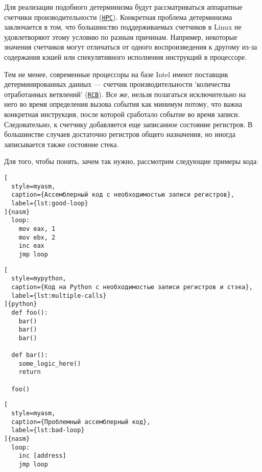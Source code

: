 Для реализации подобного детерминизма будут рассматриваться аппаратные счетчики производительности 
(\href{https://en.wikipedia.org/wiki/Hardware_performance_counter}{\texttt{HPC}}).
Конкретная проблема детерминизма заключается в том, что большинство поддерживаемых счетчиков в Linux 
не удовлетворяют этому условию по разным причинам. 
Например, некоторые значения счетчиков могут отличаться от одного воспроизведения к другому 
из-за содержания кэшей или спекулятивного исполнения инструкций в процессоре.

Тем не менее, современные процессоры на базе Intel имеют поставщик детерминированных данных — счетчик производительности 
'количества отработанных ветвлений'
(\href{https://en.wikipedia.org/wiki/Branch_predictor}{\texttt{RCB}}). 
Все же, нельзя полагаться исключительно на него во время определения вызова события как 
минимум потому, что важна конкретная инструкция, после которой сработало событие во время записи. 
Следовательно, к счетчику добавляется еще 
записанное состояние регистров. 
В большинстве случаев достаточно регистров общего назначения, но иногда записывается также состояние стека. 

Для того, чтобы понять, зачем так нужно, рассмотрим следующие примеры кода:

\newpage
\begin{lstlisting}[
  style=myasm,
  caption={Ассемблерный код с необходимостью записи регистров},
  label={lst:good-loop}
]{nasm}
  loop:
    mov eax, 1
    mov ebx, 2
    inc eax
    jmp loop
\end{lstlisting}

\begin{lstlisting}[
  style=mypython,
  caption={Код на Python с необходимостью записи регистров и стэка},
  label={lst:multiple-calls}
]{python}
  def foo():
    bar()
    bar()
    bar()
  
  def bar():
    some_logic_here()
    return

  foo()
\end{lstlisting}

\begin{lstlisting}[
  style=myasm,
  caption={Проблемный ассемблерный код},
  label={lst:bad-loop}
]{nasm}
  loop:
    inc [address]
    jmp loop
\end{lstlisting}

